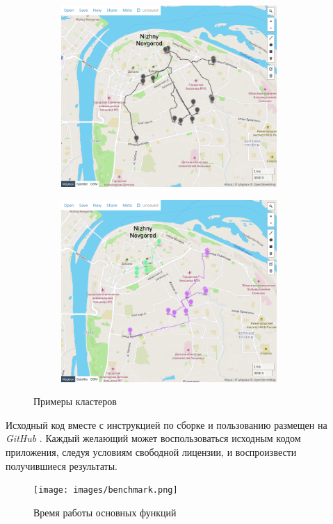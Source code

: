 \documentclass[11pt]{article}
\begin{document}
	\begin{figure}[!htbp]
	\begin{subfigure}{0.5\textwidth}
		\centering
		\includegraphics[width=0.9\textwidth]{images/k1.png}
	\end{subfigure}	
	\begin{subfigure}{0.5\textwidth}
		\centering
		\includegraphics[width=0.9\textwidth]{images/k2.png}
	\end{subfigure}	
	\caption{Примеры кластеров}
	\label{fig:cluster}
	\end{figure}	
	
	Исходный код вместе с инструкцией по сборке и пользованию размещен на \textit{GitHub} \cite{github}.    
	Каждый желающий может воспользоваться исходным кодом приложения, следуя условиям свободной лицензии, и воспроизвести получившиеся результаты.
	
	\begin{figure}[!htbp]
	\centering
	\texttt{[image: images/benchmark.png]}
	\caption{Время работы основных функций}
	\label{fig:cluster}
	\end{figure}	    
    
	
	
	
\end{document}
